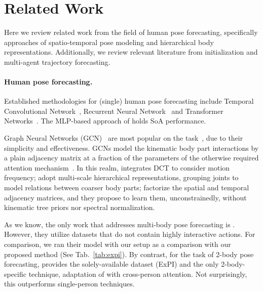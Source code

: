 \documentclass[10pt,twocolumn,letterpaper]{article}
\begin{document}
\section{Related Work}
\label{sec:related}

Here we review related work from the field of human pose forecasting, specifically approaches of spatio-temporal pose modeling and hierarchical body representations. Additionally, we review relevant literature from initialization and multi-agent trajectory forecasting.

\paragraph{Human pose forecasting.} Established methodologies for (single) human pose forecasting include Temporal Convolutional Network~\cite{Li18}, Recurrent Neural Network~\cite{mao19ltd, Fragkiadaki15, Wang19, Ma22} and Transformer Networks~\cite{guo21, Aksan21}. The MLP-based approach of \cite{guo2022back} holds SoA performance. 

Graph Neural Networks (GCN)~\cite{kipf17,yan18} are most popular on the task~\cite{Dang21,Li2022SymbioticGN,sampieri22}, due to their simplicity and effectiveness. GCNs model the kinematic body part interactions by a plain adjacency matrix at a fraction of the parameters of the otherwise required attention mechanism~\cite{guo21,mao20his}.
In this realm, \cite{mao20his} integrates DCT to consider motion frequency; \cite{Dang21,Li_2020_CVPR} adopt multi-scale hierarchical representations, grouping joints to model relations between coarser body parts; \cite{sofianos21,sampieri22} factorize the spatial and temporal adjacency matrices, and they propose to learn them, unconstrainedly, without kinematic tree priors nor spectral normalization.

As we know, the only work that addresses multi-body pose forecasting is \cite{wang21}. However, they utilize datasets that do not contain highly interactive actions. For comparison, we ran their model with our setup as a comparison with our proposed method (See Tab.~\ref{tab:expi}).
By contrast, for the task of 2-body pose forecasting, \cite{guo21} provides the solely-available dataset (ExPI) and the only 2-body-specific technique, adaptation of \cite{mao20his} with cross-person attention. Not surprisingly, this outperforms single-person techniques. 
\end{document}
